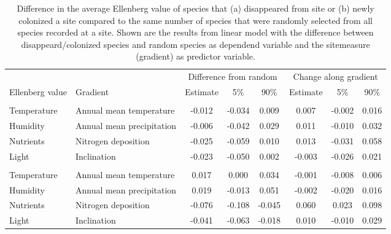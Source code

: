 \documentclass[fleqn,10pt,lineno]{wlpeerj} %
\theoremstyle{definition}
\theoremstyle{definition}
\theoremstyle{definition}
\theoremstyle{remark}
\begin{document}
\begin{table}

\caption{\label{tab:difffromrandomtab}Difference in the average Ellenberg value of species that (a) disappeared from site or (b) newly colonized a site compared to the same number of species that were randomly selected from all species recorded at a site. Shown are the results from linear model with the difference between disappeard/colonized species and random species as dependend variable and the sitemeasure (gradient) as predictor variable.}
\centering
\begin{tabular}[t]{llcccccc}
\toprule
\multicolumn{2}{c}{ } & \multicolumn{3}{c}{Difference from random} & \multicolumn{3}{c}{Change along gradient} \\
\cmidrule(l{2pt}r{2pt}){3-5} \cmidrule(l{2pt}r{2pt}){6-8}
Ellenberg value & Gradient & Estimate & 5\% & 90\% & Estimate & 5\% & 90\%\\
\midrule
\addlinespace[0.3em]
\multicolumn{8}{l}{\textit{(a) Plants that disappeard from a site}}\\
\hspace{1em}Temperature & Annual mean temperature & -0.012 & -0.034 & 0.009 & 0.007 & -0.002 & 0.016\\
\hspace{1em}Humidity & Annual mean precipitation & -0.006 & -0.042 & 0.029 & 0.011 & -0.010 & 0.032\\
\hspace{1em}Nutrients & Nitrogen deposition & -0.025 & -0.059 & 0.010 & 0.013 & -0.031 & 0.058\\
\hspace{1em}Light & Inclination & -0.023 & -0.050 & 0.002 & -0.003 & -0.026 & 0.021\\
\addlinespace[0.3em]
\multicolumn{8}{l}{\textit{(b) Plants that newly colonized a site}}\\
\hspace{1em}Temperature & Annual mean temperature & 0.017 & 0.000 & 0.034 & -0.001 & -0.008 & 0.006\\
\hspace{1em}Humidity & Annual mean precipitation & 0.019 & -0.013 & 0.051 & -0.002 & -0.020 & 0.016\\
\hspace{1em}Nutrients & Nitrogen deposition & -0.076 & -0.108 & -0.045 & 0.060 & 0.023 & 0.098\\
\hspace{1em}Light & Inclination & -0.041 & -0.063 & -0.018 & 0.010 & -0.010 & 0.029\\
\bottomrule
\end{tabular}
\end{table}
\end{document}
